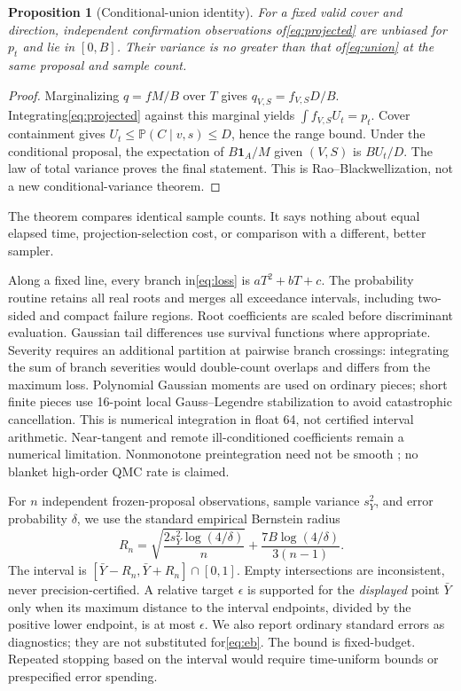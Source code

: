 \documentclass[11pt]{article}
\newtheorem{proposition}{Proposition}
\newcommand{\Pp}{\mathbb P}
\newcommand{\ind}{\mathbf 1}
\begin{document}
\begin{proposition}[Conditional-union identity]
For a fixed valid cover and direction, independent confirmation observations of\eqref{eq:projected} are unbiased for $ p_t $ and lie in $[0,B]$. Their variance is no greater than that of\eqref{eq:union} at the same proposal and sample count.
\end{proposition}
\begin{proof}
Marginalizing $ q=fM/B $ over $ T $ gives $ q_{V,S}=f_{V,S}D/B $. Integrating\eqref{eq:projected} against this marginal yields $\int f_{V,S}U_t=p_t $. Cover containment gives $ U_t\le\Pp(C\mid v,s)\le D $, hence the range bound. Under the conditional proposal, the expectation of $ B\ind_A/M $ given $(V,S)$ is $ BU_t/D $. The law of total variance proves the final statement. This is Rao--Blackwellization, not a new conditional-variance theorem.
\end{proof}
The theorem compares identical sample counts. It says nothing about equal elapsed time, projection-selection cost, or comparison with a different, better sampler.

Along a fixed line, every branch in\eqref{eq:loss} is $ aT^2+bT+c $. The probability routine retains all real roots and merges all exceedance intervals, including two-sided and compact failure regions. Root coefficients are scaled before discriminant evaluation. Gaussian tail differences use survival functions where appropriate. Severity requires an additional partition at pairwise branch crossings: integrating the sum of branch severities would double-count overlaps and differs from the maximum loss. Polynomial Gaussian moments are used on ordinary pieces; short finite pieces use 16-point local Gauss--Legendre stabilization to avoid catastrophic cancellation. This is numerical integration in float 64, not certified interval arithmetic. Near-tangent and remote ill-conditioned coefficients remain a numerical limitation. Nonmonotone preintegration need not be smooth \citep{gilbert2021}; no blanket high-order QMC rate is claimed.

For $ n $ independent frozen-proposal observations, sample variance $ s_Y^2 $, and error probability $\delta $, we use the standard empirical Bernstein radius \citep{maurer2009}
\begin{equation}
 R_n=\sqrt{\frac{2s_Y^2\log(4/\delta)}n}
       +\frac{7B\log(4/\delta)}{3(n-1)}.
 \label{eq:eb}
\end{equation}
The interval is $[\bar Y-R_n,\bar Y+R_n]\cap[0,1]$. Empty intersections are inconsistent, never precision-certified. A relative target $\epsilon $ is supported for the \emph{displayed} point $\bar Y $ only when its maximum distance to the interval endpoints, divided by the positive lower endpoint, is at most $\epsilon $. We also report ordinary standard errors as diagnostics; they are not substituted for\eqref{eq:eb}. The bound is fixed-budget. Repeated stopping based on the interval would require time-uniform bounds or prespecified error spending.
\end{document}
